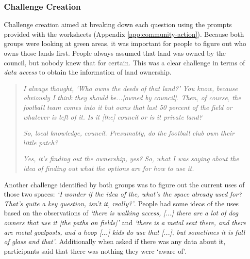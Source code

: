 \subsubsection{Challenge Creation}
Challenge creation aimed at breaking down each question using the prompts provided with the worksheets (Appendix \ref{app:community-action}). Because both groups were looking at green areas, it was important for people to figure out who owns those lands first. People always assumed that land was owned by the council, but nobody knew that for certain. This was a clear challenge in terms of \textit{data access} to obtain the information of land ownership.
\begin{quote}
    \textit{I always thought, `Who owns the deeds of that land?' You know, because obviously I think they should be...[owned by council]. Then, of course, the football team comes into it but owns that last 50 percent of the field or whatever is left of it. Is it [the] council or is it private land?}
    
    \textit{So, local knowledge, council. Presumably, do the football club own their little patch?}
    
    \textit{Yes, it's finding out the ownership, yes? So, what I was saying about the idea of finding out what the options are for how to use it.}
\end{quote}

Another challenge identified by both groups was to figure out the current uses of those two spaces: \textit{`I wonder if the idea of the, what's the space already used for? That's quite a key question, isn't it, really?'}. People had some ideas of the uses based on the observations of \textit{`there is walking access, [...] there are a lot of dog owners that use it [the paths on fields]'} and \textit{`there is a metal seat there, and there are metal goalposts, and a hoop [...] kids do use that [...], but sometimes it is full of glass and that'}. Additionally when asked if there was any data about it, participants said that there was nothing they were `aware of'.

